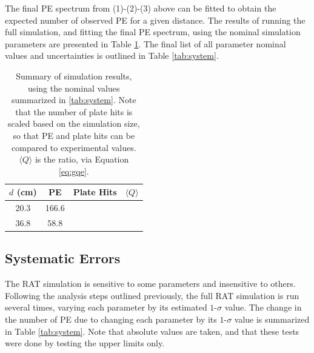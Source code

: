 \documentclass[aps,pra,notitlepage,groupedaddress]{revtex4-1}
\begin{document}
The final PE spectrum from (1)-(2)-(3) above can be fitted to obtain the expected number of observed PE for a given distance. The results of running the full simulation, and fitting the final PE spectrum, using the nominal simulation parameters are presented in Table \ref{tab:nomvals}. The final list of all parameter nominal values and uncertainties is outlined in Table \ref{tab:system}. 

\begin{table}
	\begin{center}
		\begin{tabular}{| c | c | c | c |}
			\hline
			$d$	(cm) &	PE	&	Plate Hits	&	$\langle Q \rangle$ \\
			\hline
			20.3	&	166.6	&	&	\\
			36.8	&	58.8	&	& \\
			\hline
		\end{tabular}
	\end{center}
	\caption{Summary of simulation results, using the nominal values summarized in \ref{tab:system}. Note that the number of plate hits is scaled based on the simulation size, so that PE and plate hits can be compared to experimental values. $\langle Q \rangle$ is the ratio, via Equation \ref{eq:gqe}. \label{tab:nomvals}}
\end{table}

\subsection{Systematic Errors}\label{ssec:system}

The RAT simulation is sensitive to some parameters and insensitive to others. Following the analysis steps outlined previously, the full RAT simulation is run several times, varying each parameter by its estimated $1$-$\sigma$ value. The change in the number of PE due to changing each parameter by its $1$-$\sigma$ value is summarized in Table \ref{tab:system}. Note that absolute values are taken, and that these tests were done by testing the upper limits only.
\end{document}

